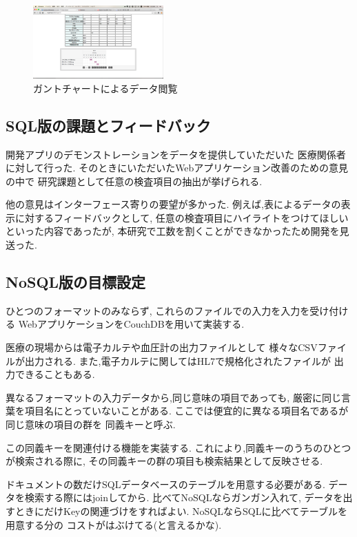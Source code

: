     \begin{figure}[htbp]
        \includegraphics[width=5cm, bb=0 0 437 688]{./gazou/DjangoGantt.png}
      \caption{ガントチャートによるデータ閲覧}
      \label{DjangoGantt}
    \end{figure}


\subsection{SQL版の課題とフィードバック}

  開発アプリのデモンストレーションをデータを提供していただいた
  医療関係者に対して行った.
  そのときにいただいたWebアプリケーション改善のための意見の中で
  研究課題として任意の検査項目の抽出が挙げられる.

  他の意見はインターフェース寄りの要望が多かった.
  例えば,表によるデータの表示に対するフィードバックとして,
  任意の検査項目にハイライトをつけてほしいといった内容であったが,
  本研究で工数を割くことができなかったため開発を見送った.
\fi

\subsection{NoSQL版の目標設定}
  ひとつのフォーマットのみならず,
  これらのファイルでの入力を入力を受け付ける
  WebアプリケーションをCouchDBを用いて実装する.

  医療の現場からは電子カルテや血圧計の出力ファイルとして
  様々なCSVファイルが出力される.
  また,電子カルテに関してはHL7で規格化されたファイルが
  出力できることもある.

  異なるフォーマットの入力データから,同じ意味の項目であっても,
  厳密に同じ言葉を項目名にとっていないことがある.
  ここでは便宜的に異なる項目名であるが同じ意味の項目の群を
  同義キーと呼ぶ.

  この同義キーを関連付ける機能を実装する.
  これにより,同義キーのうちのひとつが検索される際に,
  その同義キーの群の項目も検索結果として反映させる.

  ドキュメントの数だけSQLデータベースのテーブルを用意する必要がある.
  データを検索する際にはjoinしてから.
  比べてNoSQLならガンガン入れて,
  データを出すときにだけKeyの関連づけをすればよい.
  NoSQLならSQLに比べてテーブルを用意する分の
  コストがはぶけてる(と言えるかな).
  \fi
